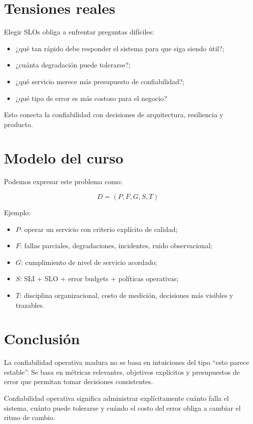\documentclass[variant=apuntes,cover=institutional,mode=screen]{ua-engineering-v6-article}
\begin{document}
\section{Tensiones reales}

Elegir SLOs obliga a enfrentar preguntas difíciles:
\begin{itemize}
\item ¿qué tan rápido debe responder el sistema para que siga siendo útil?;
\item ¿cuánta degradación puede tolerarse?;
\item ¿qué servicio merece más presupuesto de confiabilidad?;
\item ¿qué tipo de error es más costoso para el negocio?
\end{itemize}

Esto conecta la confiabilidad con decisiones de arquitectura, resiliencia y producto.

\section{Modelo del curso}

Podemos expresar este problema como:

\[
D = (P, F, G, S, T)
\]

Ejemplo:
\begin{itemize}
\item $P$: operar un servicio con criterio explícito de calidad;
\item $F$: fallas parciales, degradaciones, incidentes, ruido observacional;
\item $G$: cumplimiento de nivel de servicio acordado;
\item $S$: SLI + SLO + error budgets + políticas operativas;
\item $T$: disciplina organizacional, costo de medición, decisiones más visibles y trazables.
\end{itemize}

\section{Conclusión}

La confiabilidad operativa madura no se basa en intuiciones del tipo “esto parece estable”. Se basa en métricas relevantes, objetivos explícitos y presupuestos de error que permitan tomar decisiones consistentes.

\begin{uakeybox}
Confiabilidad operativa significa administrar explícitamente cuánto falla el sistema, cuánto puede tolerarse y cuándo el costo del error obliga a cambiar el ritmo de cambio.
\end{uakeybox}
\end{document}
